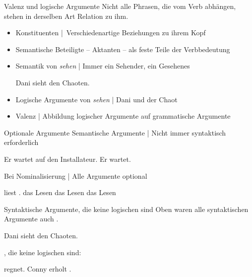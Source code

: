 \begin{frame}
  {Valenz und logische Argumente}
  \onslide<+->
  \onslide<+->
  Nicht alle Phrasen, die vom Verb abhängen, stehen in derselben Art Relation zu ihm.\\
  \Zeile
  \begin{itemize}[<+->]
    \item Konstituenten | Verschiedenartige Beziehungen zu ihrem Kopf
    \item Semantische Beteiligte -- \alert{Aktanten} -- als \alert{feste Teile der Verbbedeutung}
    \item Semantik von \textit{sehen} | Immer ein \alert{Sehender}, ein \alert{Gesehenes}
      \Viertelzeile
      \begin{exe}
       \ex Dani sieht den Chaoten.
      \end{exe}
    \item \alert{Logische Argumente von \textit{sehen}} | Dani und der Chaot
    \item Valenz | Abbildung logischer Argumente auf grammatische Argumente
  \end{itemize}
\end{frame}

\begin{frame}
  {Optionale Argumente}
  \onslide<+->
  \onslide<+->
  Semantische Argumente | Nicht immer syntaktisch erforderlich\\
  \onslide<+->
  \Halbzeile
    \begin{exe}
      \ex Er wartet \alert{auf den Installateur}.
      \ex Er wartet.
    \end{exe}
  \onslide<+->
  \Zeile
  Bei \alert{Nominalisierung} | Alle Argumente optional\\
  \onslide<+->
  \Halbzeile
    \begin{exe}
      \ex {} \alert{liest} .
      \ex \alert{das Lesen}  
      \ex \alert{das Lesen}  
      \ex \alert{das Lesen} 
    \end{exe}
\end{frame}



\begin{frame}
  {Syntaktische Argumente, die keine logischen sind}
  \onslide<+->
  \onslide<+->
  Oben waren alle \alert{syntaktischen Argumente} auch .\\
  \Halbzeile
  \begin{exe}
    \ex \alert{Dani} sieht \alert{den Chaoten}.
  \end{exe}
  \onslide<+->
  \Zeile
  , die keine logischen sind:\\
  \Halbzeile
  \onslide<+->
  \begin{exe}
    \ex {} regnet.
    \ex Conny erholt .
  \end{exe}
\end{frame}

